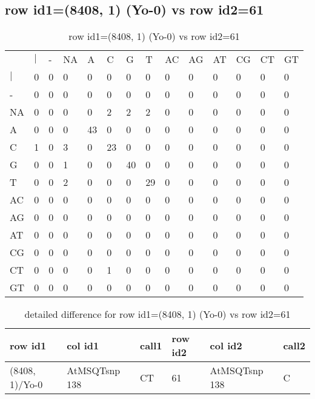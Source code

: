 \subsection{row id1=(8408, 1) (Yo-0) vs row id2=61}
\begin{center}
\begin{longtable}{|l|l|l|l|l|l|l|l|l|l|l|l|l|l|}
\caption{row id1=(8408, 1) (Yo-0) vs row id2=61} \label{table_dm672}\\
\hline
\\
\hline
&$|$&-&NA&A&C&G&T&AC&AG&AT&CG&CT&GT\\
$|$&0&0&0&0&0&0&0&0&0&0&0&0&0\\
-&0&0&0&0&0&0&0&0&0&0&0&0&0\\
NA&0&0&0&0&2&2&2&0&0&0&0&0&0\\
A&0&0&0&43&0&0&0&0&0&0&0&0&0\\
C&1&0&3&0&23&0&0&0&0&0&0&0&0\\
G&0&0&1&0&0&40&0&0&0&0&0&0&0\\
T&0&0&2&0&0&0&29&0&0&0&0&0&0\\
AC&0&0&0&0&0&0&0&0&0&0&0&0&0\\
AG&0&0&0&0&0&0&0&0&0&0&0&0&0\\
AT&0&0&0&0&0&0&0&0&0&0&0&0&0\\
CG&0&0&0&0&0&0&0&0&0&0&0&0&0\\
CT&0&0&0&0&1&0&0&0&0&0&0&0&0\\
GT&0&0&0&0&0&0&0&0&0&0&0&0&0\\
\hline
\end{longtable}
\end{center}

\begin{center}
\begin{longtable}{|l|l|l|l|l|l|}
\caption{detailed difference for row id1=(8408, 1) (Yo-0) vs row id2=61} \label{table_dm673}\\
\hline
row id1&col id1&call1&row id2&col id2&call2\\
\hline
(8408, 1)/Yo-0&AtMSQTsnp 138&CT&61&AtMSQTsnp 138&C\\
\hline
\end{longtable}
\end{center}

